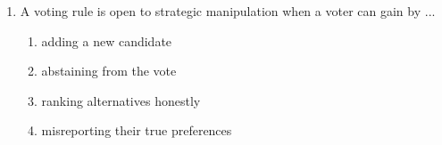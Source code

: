\documentclass[11pt]{article}
\begin{document}
\begin{enumerate}[itemsep=6pt]
\begin{enumerate}
    \item 1 point
    \item 0 points
  \end{enumerate}
  \item A voting rule is open to strategic manipulation when a voter can gain by ...
  \begin{enumerate}
    \item adding a new candidate
    \item abstaining from the vote
    \item ranking alternatives honestly
    \item misreporting their true preferences
  \end{enumerate}
\end{enumerate}
\end{document}
